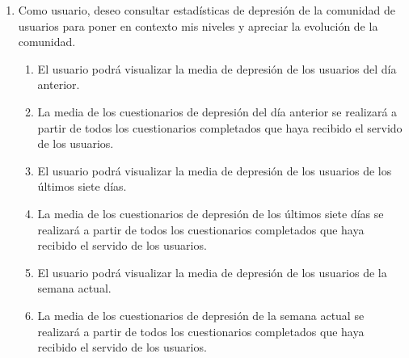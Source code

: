         \begin{enumerate}[resume=req-usuario,label=\textbf{\texttt{RU-\arabic*}}]
            \item Como usuario, deseo consultar estadísticas de depresión de la comunidad de usuarios para poner en contexto mis niveles y apreciar la evolución de la comunidad.
            \begin{enumerate}[resume=req-funcionales,label=\textbf{\texttt{RF-\arabic*}}]
                \item El usuario podrá visualizar la media de depresión de los usuarios del día anterior.
                \item La media de los cuestionarios de depresión del día anterior se realizará a partir de todos los cuestionarios completados que haya recibido el servido de los usuarios.
                \item El usuario podrá visualizar la media de depresión de los usuarios de los últimos siete días.
                \item La media de los cuestionarios de depresión de los últimos siete días se realizará a partir de todos los cuestionarios completados que haya recibido el servido de los usuarios.
                \item El usuario podrá visualizar la media de depresión de los usuarios de la semana actual.
                \item La media de los cuestionarios de depresión de la semana actual se realizará a partir de todos los cuestionarios completados que haya recibido el servido de los usuarios.
            \end{enumerate}
        \end{enumerate}
